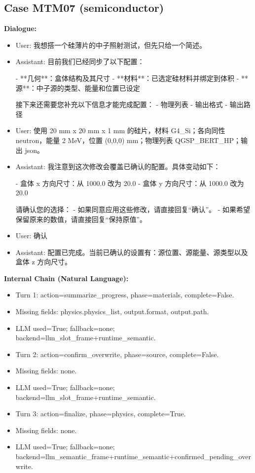 \documentclass[11pt]{ctexart}
\begin{document}
\subsection{Case MTM07 (semiconductor)}
\textbf{Dialogue:}
\begin{itemize}
\item User: 我想搭一个硅薄片的中子照射测试，但先只给一个简述。
\item Assistant: 目前我们已经同步了以下配置：

- **几何**：盒体结构及其尺寸
- **材料**：已选定硅材料并绑定到体积
- **源**：中子源的类型、能量和位置已设定

接下来还需要您补充以下信息才能完成配置：
- 物理列表
- 输出格式
- 输出路径
\item User: 使用 20 mm x 20 mm x 1 mm 的硅片，材料 G4\_Si；各向同性 neutron，能量 2 MeV，位置 (0,0,0) mm；物理列表 QGSP\_BERT\_HP；输出 json。
\item Assistant: 我注意到这次修改会覆盖已确认的配置。具体变动如下：

- 盒体 x 方向尺寸：从 1000.0 改为 20.0
- 盒体 y 方向尺寸：从 1000.0 改为 20.0

请确认您的选择：
- 如果同意应用这些修改，请直接回复“确认”。
- 如果希望保留原来的数值，请直接回复“保持原值”。
\item User: 确认
\item Assistant: 配置已完成。当前已确认的设置有：源位置、源能量、源类型以及盒体 z 方向尺寸。
\end{itemize}
\textbf{Internal Chain (Natural Language):}
\begin{itemize}
\item Turn 1: action=summarize\_progress, phase=materials, complete=False.
\item Missing fields: physics.physics\_list, output.format, output.path.
\item LLM used=True; fallback=none; backend=llm\_slot\_frame+runtime\_semantic.
\item Turn 2: action=confirm\_overwrite, phase=source, complete=False.
\item Missing fields: none.
\item LLM used=True; fallback=none; backend=llm\_slot\_frame+runtime\_semantic.
\item Turn 3: action=finalize, phase=physics, complete=True.
\item Missing fields: none.
\item LLM used=True; fallback=none; backend=llm\_semantic\_frame+runtime\_semantic+confirmed\_pending\_overwrite.
\end{itemize}
\end{document}

